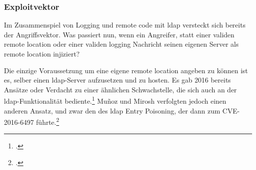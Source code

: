 
\subsubsection{Exploitvektor}
Im Zusammenspiel von Logging und remote code mit \gls{ldap} versteckt sich bereits der Angriffsvektor.
Was passiert nun, wenn ein Angreifer, statt einer validen remote location oder einer validen logging Nachricht seinen eigenen Server als remote location injiziert?

Die einzige Voraussetzung um eine eigene remote location angeben zu können ist es, selber einen \gls{ldap}-Server aufzusetzen und zu hosten.
Es gab 2016 bereits Ansätze oder Verdacht zu einer ähnlichen Schwachstelle, die sich auch an der \gls{ldap}-Funktionalität bediente.\footcite{blackhatPresentation}
Muñoz und Mirosh verfolgten jedoch einen anderen Ansatz, und zwar den des \gls{ldap} Entry Poisoning, der dann zum CVE-2016-6497 führte.\footcite{cve2016}

